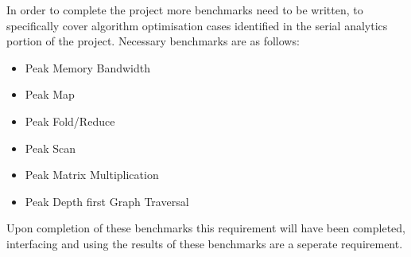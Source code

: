 In order to complete the project more benchmarks need to be written, to specifically cover algorithm optimisation cases identified in the serial analytics portion of the project. Necessary benchmarks are as follows: 

\begin{itemize}
\item Peak Memory Bandwidth
\item Peak Map
\item Peak Fold/Reduce
\item Peak Scan
\item Peak Matrix Multiplication
\item Peak Depth first Graph Traversal
\end{itemize}

Upon completion of these benchmarks this requirement will have been completed, interfacing and using the results of these benchmarks are a seperate requirement.